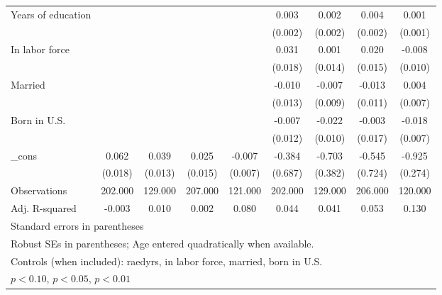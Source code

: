 \begin{table}[htbp]
\begin{tabular}{l*{8}{c}}
Years of education&                  &                  &                  &                  &    0.003         &    0.002         &    0.004\sym{*}  &    0.001         \\
          &                  &                  &                  &                  &  (0.002)         &  (0.002)         &  (0.002)         &  (0.001)         \\
In labor force&                  &                  &                  &                  &    0.031\sym{*}  &    0.001         &    0.020         &   -0.008         \\
          &                  &                  &                  &                  &  (0.018)         &  (0.014)         &  (0.015)         &  (0.010)         \\
Married   &                  &                  &                  &                  &   -0.010         &   -0.007         &   -0.013         &    0.004         \\
          &                  &                  &                  &                  &  (0.013)         &  (0.009)         &  (0.011)         &  (0.007)         \\
Born in U.S.&                  &                  &                  &                  &   -0.007         &   -0.022\sym{**} &   -0.003         &   -0.018\sym{**} \\
          &                  &                  &                  &                  &  (0.012)         &  (0.010)         &  (0.017)         &  (0.007)         \\
\_cons    &    0.062\sym{***}&    0.039\sym{***}&    0.025\sym{*}  &   -0.007         &   -0.384         &   -0.703\sym{*}  &   -0.545         &   -0.925\sym{***}\\
          &  (0.018)         &  (0.013)         &  (0.015)         &  (0.007)         &  (0.687)         &  (0.382)         &  (0.724)         &  (0.274)         \\
\midrule
Observations&  202.000         &  129.000         &  207.000         &  121.000         &  202.000         &  129.000         &  206.000         &  120.000         \\
Adj. R-squared&   -0.003         &    0.010         &    0.002         &    0.080         &    0.044         &    0.041         &    0.053         &    0.130         \\
\bottomrule
\multicolumn{9}{l}{\footnotesize Standard errors in parentheses}\\
\multicolumn{9}{l}{\footnotesize Robust SEs in parentheses; Age entered quadratically when available.}\\
\multicolumn{9}{l}{\footnotesize Controls (when included): raedyrs, in labor force, married, born in U.S.}\\
\multicolumn{9}{l}{\footnotesize \sym{*} \(p<0.10\), \sym{**} \(p<0.05\), \sym{***} \(p<0.01\)}\\
\end{tabular}
\end{table}
